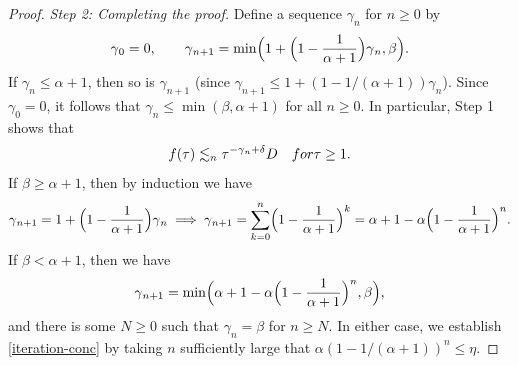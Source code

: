 \documentclass[10pt,a4paper]{amsart}
\newcommand{\step}[1]{\smallskip\noindent\emph{#1}}
\begin{document}
\begin{proof}
\step{Step 2: Completing the proof.} Define a sequence \(\gamma_n\) for \(n\ge 0\) by
\begin{equation}
\gamma{}_0=0,\qquad \gamma{}_{n+1} = \min \Bigl(1 + \Bigl(1-\frac{1}{\alpha{}+1}\Bigr)\gamma{}_n,\beta{}\Bigr).
\end{equation}
If \(\gamma_n\le \alpha{} + 1\), then so is \(\gamma_{n + 1}\) (since \(\gamma_{n + 1}\le 1 + (1-1/(\alpha{} +
1))\gamma_n\)). Since \(\gamma_0 = 0\), it follows that \(\gamma_n\le \min (\beta{},\alpha{} +
1)\) for all \(n\ge 0\). In particular, Step 1 shows that
\begin{equation}
f(\tau{})\lesssim_n \tau^{-\gamma{}_n+\delta{}}D\quad \textnormal{for }\tau{}\ge 1.
\end{equation}
If \(\beta{}\ge \alpha{} + 1\), then by induction we have
\begin{equation}
\gamma{}_{n+1} = 1 + \Bigl(1-\frac{1}{\alpha{}+1}\Bigr)\gamma{}_n\implies \gamma{}_{n+1} = \sum_{k=0}^n\Bigl(1-\frac{1}{\alpha{}+1}\Bigr)^k = \alpha{}+1-\alpha{}\Bigl(1-\frac{1}{\alpha{}+1}\Bigr)^n.
\end{equation}
If \(\beta{}<\alpha{} + 1\), then we have
\begin{equation}
\gamma{}_{n+1} = \min \Bigl(\alpha{}+1-\alpha{}\Bigl(1-\frac{1}{\alpha{}+1}\Bigr)^n,\beta{}\Bigr),
\end{equation}
and there is some \(N\ge 0\) such that \(\gamma_n=\beta{}\) for \(n\ge N\). In either case, we
establish \cref{iteration-conc} by taking \(n\) sufficiently large that
\(\alpha{}(1-1/(\alpha{} + 1))^n \le \eta{}\).
\end{proof}
\end{document}
